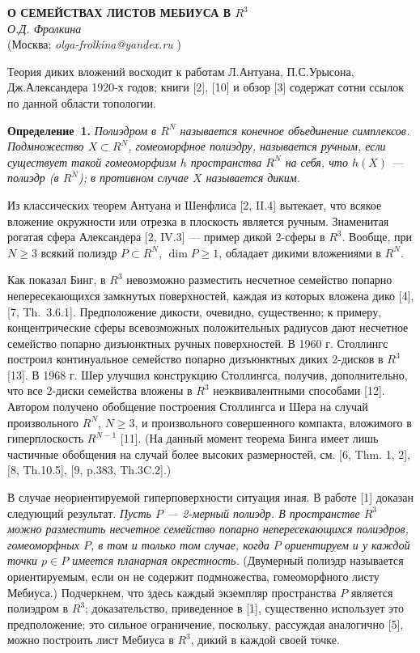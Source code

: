 \begin{center}{ \bf  О СЕМЕЙСТВАХ ЛИСТОВ МЕБИУСА В $R^3$}\\
{\it О.Д. Фролкина } \\
(Москва; {\it olga-frolkina@yandex.ru} )
\end{center}


Теория диких вложений
восходит к работам Л.Антуана, П.С.Урысона,
Дж.Александера 1920-х годов;
книги [2], [10] и обзор [3]
содержат сотни ссылок по данной области
топологии.

\textbf{Определение~1.} {\it
Полиэдром в $R^N$ называется
конечное объединение симплексов.
Подмножество $X\subset R^N$, гомеоморфное полиэдру,
называется ручным, если существует такой гомеоморфизм
$h$ пространства $R^N$ на себя, что
$h(X)$  --- полиэдр (в $R^N$);
в противном случае $X$ называется диким.
}

Из классических теорем Антуана и
Шенфлиса [2, II.4] вытекает, что
всякое вложение
окружности или отрезка в плоскость является
ручным.
Знаменитая рогатая сфера Александера [2, IV.3] --- пример
дикой 2-сферы в $R^3$.
Вообще, при $N\geqslant 3$
всякий полиэдр $P\subset R^N$, $\dim P\geqslant 1$,
обладает дикими вложениями в $R^N$.

Как показал Бинг,
в $R^3$ невозможно разместить
несчетное семейство попарно непересекающихся
замкнутых поверхностей,
каждая из которых вложена дико [4], [7, Th.~3.6.1].
Предположение дикости, очевидно, существенно;
к примеру, концентрические сферы всевозможных
положительных радиусов дают несчетное семейство попарно дизъюнктных ручных поверхностей.
В 1960 г. Столлингс построил континуальное
семейство попарно дизъюнктных диких 2-дисков
в $R^3$ [13].
В 1968 г. Шер улучшил конструкцию Столлингса,
получив, дополнительно, что все 2-диски
семейства вложены в $R^3$ неэквивалентными способами [12].
Автором получено обобщение построения Столлингса и Шера на случай
произвольного $R^N$, $N\geqslant 3$,
и произвольного совершенного компакта,
вложимого в гиперплоскость $R^{N-1}$ [11].
(На данный момент теорема Бинга
имеет лишь частичные обобщения на случай более высоких размерностей,
см. [6, Thm. 1, 2],
[8, Th.10.5],
[9, p.383, Th.3C.2].)

В случае неориентируемой гиперповерхности ситуация иная.
В работе [1]
доказан следующий результат.
{\it Пусть $P$ --- 2-мерный полиэдр.
В пространстве $R^3$ можно разместить несчетное
семейство попарно непересекающихся
полиэдров, гомеоморфных $P$,
в том и только том случае, когда
$P$ ориентируем и у каждой точки
$p\in P$
имеется планарная окрестность.}
(Двумерный полиэдр называется
ориентируемым, если он не содержит подмножества,
гомеоморфного листу Мебиуса.)
Подчеркнем, что
здесь каждый экземпляр пространства $P$
является полиэдром в $R^3$;
доказательство,
приведенное в [1],
существенно использует это предположение;
это сильное ограничение, поскольку,
рассуждая аналогично [5], можно построить лист Мебиуса в
$R^3$, дикий в каждой своей точке.

